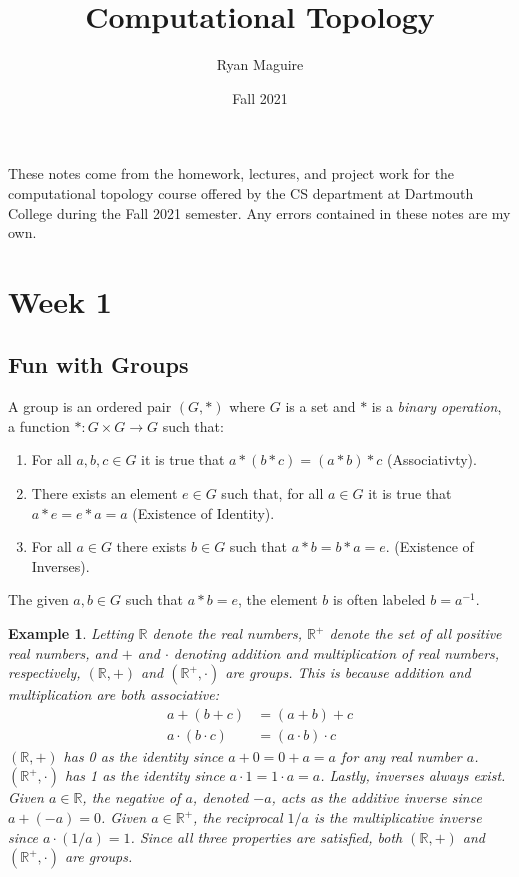 \documentclass{article}
\title{Computational Topology}
\author{Ryan Maguire}
\date{Fall 2021}
\theoremstyle{plain}
\theoremstyle{normal}
\newtheorem{example}{Example}[section]
\begin{document}
    \maketitle
    These notes come from the homework, lectures, and project work for
    the computational topology course offered by the CS department at
    Dartmouth College during the Fall 2021 semester. Any errors contained
    in these notes are my own.
    \tableofcontents
    \section{Week 1}
        \subsection{Fun with Groups}
            A group is an ordered pair $(G,*)$ where $G$ is a set and $*$ is a
            \textit{binary operation}, a function $*:G\times{G}\rightarrow{G}$
            such that:
            \begin{enumerate}
                \item For all $a,b,c\in{G}$ it is true that $a*(b*c)=(a*b)*c$
                      (Associativty).
                \item There exists an element $e\in{G}$ such that, for all
                      $a\in{G}$ it is true that $a*e=e*a=a$
                      (Existence of Identity).
                \item For all $a\in{G}$ there exists $b\in{G}$ such that
                      $a*b=b*a=e$. (Existence of Inverses).
            \end{enumerate}
            The given $a,b\in{G}$ such that $a*b=e$, the element $b$ is often
            labeled $b=a^{-1}$.
            \begin{example}
                Letting $\mathbb{R}$ denote the real numbers,
                $\mathbb{R}^{+}$ denote the set of all positive real numbers,
                and $+$ and $\cdot$ denoting addition and multiplication of
                real numbers, respectively, $(\mathbb{R},+)$ and
                $(\mathbb{R}^{+},\cdot)$ are groups. This is because addition
                and multiplication are both associative:
                \begin{align}
                    a+(b+c)&=(a+b)+c\\
                    a\cdot(b\cdot{c})&=(a\cdot{b})\cdot{c}
                \end{align}
                $(\mathbb{R},+)$ has 0 as the identity since $a+0=0+a=a$ for
                any real number $a$. $(\mathbb{R}^{+},\cdot)$ has 1 as the
                identity since $a\cdot{1}=1\cdot{a}=a$. Lastly, inverses always
                exist. Given $a\in\mathbb{R}$, the negative of $a$, denoted
                $-a$, acts as the additive inverse since $a+(-a)=0$. Given
                $a\in\mathbb{R}^{+}$, the reciprocal $1/a$ is the
                multiplicative inverse since $a\cdot(1/a)=1$. Since all three
                properties are satisfied, both $(\mathbb{R},+)$ and
                $(\mathbb{R}^{+},\cdot)$ are groups.
            \end{example}
\end{document}
